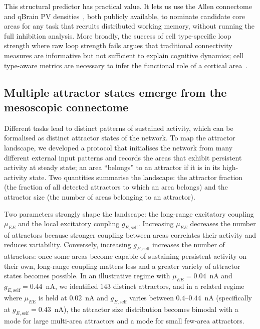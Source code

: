 \documentclass[11pt]{article}
\begin{document}
This structural predictor has practical value. It lets us use the Allen connectome~\cite{oh2014mesoscale,harris2019hierarchical} and qBrain PV densities~\cite{kim2017braintype}, both publicly available, to nominate candidate core areas for any task that recruits distributed working memory, without running the full inhibition analysis. More broadly, the success of cell type-specific loop strength where raw loop strength fails argues that traditional connectivity measures are informative but not sufficient to explain cognitive dynamics; cell type-aware metrics are necessary to infer the functional role of a cortical area~\cite{wang2020macroscopic,fulcher2019overlapping}.

\subsection{Multiple attractor states emerge from the mesoscopic connectome}\label{sec:results-attractors}

Different tasks lead to distinct patterns of sustained activity, which can be formalised as distinct attractor states of the network. To map the attractor landscape, we developed a protocol that initialises the network from many different external input patterns and records the areas that exhibit persistent activity at steady state; an area ``belongs'' to an attractor if it is in its high-activity state. Two quantities summarise the landscape: the attractor fraction (the fraction of all detected attractors to which an area belongs) and the attractor size (the number of areas belonging to an attractor).

Two parameters strongly shape the landscape: the long-range excitatory coupling $\mu_{EE}$ and the local excitatory coupling $g_{E,\text{self}}$. Increasing $\mu_{EE}$ decreases the number of attractors because stronger coupling between areas correlates their activity and reduces variability. Conversely, increasing $g_{E,\text{self}}$ increases the number of attractors: once some areas become capable of sustaining persistent activity on their own, long-range coupling matters less and a greater variety of attractor states becomes possible. In an illustrative regime with $\mu_{EE}=0.04$~nA and $g_{E,\text{self}}=0.44$~nA, we identified $143$ distinct attractors, and in a related regime where $\mu_{EE}$ is held at $0.02$~nA and $g_{E,\text{self}}$ varies between $0.4$--$0.44$~nA (specifically at $g_{E,\text{self}}=0.43$~nA), the attractor size distribution becomes bimodal with a mode for large multi-area attractors and a mode for small few-area attractors.
\end{document}
